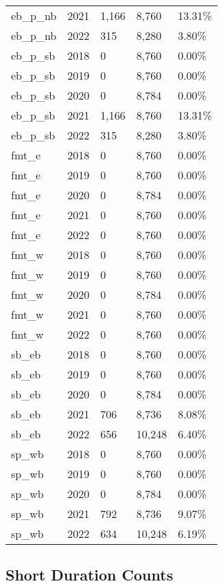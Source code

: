 \documentclass[
  letterpaper,
]{scrbook}
\begin{document}
\begin{longtable}[t]{lrlll}
eb\_p\_nb & 2021 & 1,166 & 8,760 & 13.31\%\\
eb\_p\_nb & 2022 & 315 & 8,280 & 3.80\%\\
eb\_p\_sb & 2018 & 0 & 8,760 & 0.00\%\\
\addlinespace
eb\_p\_sb & 2019 & 0 & 8,760 & 0.00\%\\
eb\_p\_sb & 2020 & 0 & 8,784 & 0.00\%\\
eb\_p\_sb & 2021 & 1,166 & 8,760 & 13.31\%\\
eb\_p\_sb & 2022 & 315 & 8,280 & 3.80\%\\
fmt\_e & 2018 & 0 & 8,760 & 0.00\%\\
\addlinespace
fmt\_e & 2019 & 0 & 8,760 & 0.00\%\\
fmt\_e & 2020 & 0 & 8,784 & 0.00\%\\
fmt\_e & 2021 & 0 & 8,760 & 0.00\%\\
fmt\_e & 2022 & 0 & 8,760 & 0.00\%\\
fmt\_w & 2018 & 0 & 8,760 & 0.00\%\\
\addlinespace
fmt\_w & 2019 & 0 & 8,760 & 0.00\%\\
fmt\_w & 2020 & 0 & 8,784 & 0.00\%\\
fmt\_w & 2021 & 0 & 8,760 & 0.00\%\\
fmt\_w & 2022 & 0 & 8,760 & 0.00\%\\
sb\_eb & 2018 & 0 & 8,760 & 0.00\%\\
\addlinespace
sb\_eb & 2019 & 0 & 8,760 & 0.00\%\\
sb\_eb & 2020 & 0 & 8,784 & 0.00\%\\
sb\_eb & 2021 & 706 & 8,736 & 8.08\%\\
sb\_eb & 2022 & 656 & 10,248 & 6.40\%\\
sp\_wb & 2018 & 0 & 8,760 & 0.00\%\\
\addlinespace
sp\_wb & 2019 & 0 & 8,760 & 0.00\%\\
sp\_wb & 2020 & 0 & 8,784 & 0.00\%\\
sp\_wb & 2021 & 792 & 8,736 & 9.07\%\\
sp\_wb & 2022 & 634 & 10,248 & 6.19\%\\
\bottomrule
\end{longtable}

\hypertarget{short-duration-counts}{%
\subsection{Short Duration Counts}\label{short-duration-counts}}
\end{document}
